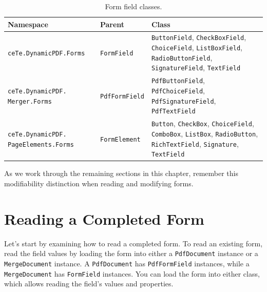 \documentclass[american]{tufte-book}
\providecommand{\tabularnewline}{\\}
\numberwithin{equation}{section}
\numberwithin{figure}{section}
\begin{document}
{{\begin{table}
\begin{tabular}{>{\raggedright}p{}>{\raggedright}p{}>{\raggedright}p{}}
\toprule 
{\footnotesize Namespace} & {\footnotesize Parent} & {\footnotesize Class}\tabularnewline
\midrule 
{\footnotesize\texttt{ceTe.DynamicPDF.Forms}} & {\footnotesize\texttt{FormField}} & {\footnotesize\texttt{ButtonField}}{\footnotesize , }{\footnotesize\texttt{CheckBoxField}}{\footnotesize ,
}{\footnotesize\texttt{ChoiceField}}{\footnotesize , }{\footnotesize\texttt{ListBoxField}}{\footnotesize ,
}{\footnotesize\texttt{RadioButtonField}}{\footnotesize , }{\footnotesize\texttt{SignatureField}}{\footnotesize ,
}{\footnotesize\texttt{TextField}}\tabularnewline
{\footnotesize\texttt{ceTe.DynamicPDF. Merger.Forms}} & {\footnotesize\texttt{PdfFormField}} & {\footnotesize\texttt{PdfButtonField}}{\footnotesize , }{\footnotesize\texttt{PdfChoiceField}}{\footnotesize ,
}{\footnotesize\texttt{PdfSignatureField}}{\footnotesize , }{\footnotesize\texttt{PdfTextField}}\tabularnewline
{\footnotesize\texttt{ceTe.DynamicPDF. PageElements.Forms}} & {\footnotesize\texttt{FormElement}} & {\footnotesize\texttt{Button}}{\footnotesize , }{\footnotesize\texttt{CheckBox}}{\footnotesize ,
}{\footnotesize\texttt{ChoiceField}}{\footnotesize , }{\footnotesize\texttt{ComboBox}}{\footnotesize ,
}{\footnotesize\texttt{ListBox}}{\footnotesize , }{\footnotesize\texttt{RadioButton}}{\footnotesize ,
}{\footnotesize\texttt{RichTextField}}{\footnotesize , }{\footnotesize\texttt{Signature}}{\footnotesize ,
}{\footnotesize\texttt{TextField}}\tabularnewline
\bottomrule
\end{tabular}\caption{Form field classes.}\label{tab:Form-field-classes.}

\end{table}

As we work through the remaining sections in this chapter, remember
this modifiability distinction when reading and modifying forms.

\section{Reading a Completed Form}

Let's start by examining how to read a completed form. To read an
existing form, read the field values by loading the form into either
a \texttt{PdfDocument} instance or a \texttt{MergeDocument} instance.
A \texttt{PdfDocument} has \texttt{PdfFormField} instances, while
a \texttt{MergeDocument} has \texttt{FormField} instances. You can
load the form into either class, which allows reading the field's
values and properties. 

}}
\end{document}
